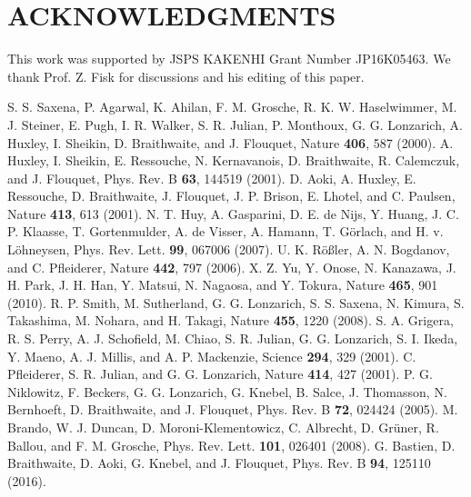 \documentclass[twocolumn,showpacs,preprintnumbers,amsmath,amssymb]{revtex4}
\begin{document}
 \section{ACKNOWLEDGMENTS}
This work was supported by JSPS KAKENHI Grant Number JP16K05463. We thank Prof. Z. Fisk for discussions and his editing of this paper. 




\begin{references}

S. S. Saxena, P. Agarwal, K. Ahilan, F. M. Grosche, R. K. W. Haselwimmer, M. J. Steiner, E. Pugh, I. R. Walker, S. R. Julian, P. Monthoux, G. G. Lonzarich, A. Huxley, I. Sheikin, D. Braithwaite, and J. Flouquet, Nature {\bf 406}, 587 (2000).%
  A. Huxley, I. Sheikin, E. Ressouche, N. Kernavanois, D. Braithwaite, R. Calemczuk, and J. Flouquet, Phys. Rev. B {\bf 63}, 144519 (2001).
D. Aoki, A. Huxley, E. Ressouche, D. Braithwaite, J. Flouquet, J. P. Brison, E. Lhotel, and C. Paulsen, Nature {\bf 413}, 613 (2001).
 N. T. Huy, A. Gasparini, D. E. de Nijs, Y. Huang, J. C. P. Klaasse, T. Gortenmulder, A. de Visser, A. Hamann, T. G{\"{o}}rlach, and H. v. L{\"{o}}hneysen, Phys. Rev. Lett. {\bf 99}, 067006 (2007). 
U. K. R\"o\ss ler, A. N. Bogdanov, and C. Pfleiderer, Nature {\bf 442}, 797 (2006).%
X. Z. Yu, Y. Onose, N. Kanazawa, J. H. Park, J. H. Han, Y. Matsui, N. Nagaosa, and Y. Tokura, Nature {\bf 465}, 901 (2010).%
R. P. Smith, M. Sutherland, G. G. Lonzarich, S. S. Saxena, N. Kimura, S. Takashima, M. Nohara, and H. Takagi, Nature {\bf 455}, 1220 (2008).%
S. A. Grigera, R. S. Perry, A. J. Schofield, M. Chiao, S. R. Julian, G. G. Lonzarich, S. I. Ikeda, Y. Maeno, A. J. Millis, and A. P. Mackenzie, Science {\bf 294}, 329 (2001). %
 C. Pfleiderer, S. R. Julian, and G. G. Lonzarich, Nature {\bf 414}, 427 (2001).%
 P. G. Niklowitz, F. Beckers, G. G. Lonzarich, G. Knebel, B. Salce, J. Thomasson, N. Bernhoeft, D. Braithwaite, and J. Flouquet, Phys. Rev. B {\bf 72}, 024424 (2005).%
 M. Brando, W. J. Duncan, D. Moroni-Klementowicz, C. Albrecht, D. Gr{\"{u}}ner, R. Ballou, and F. M. Grosche, Phys. Rev. Lett. {\bf 101}, 026401 (2008).%
G. Bastien, D. Braithwaite, D. Aoki, G. Knebel, and J. Flouquet, Phys. Rev. B {\bf 94}, 125110 (2016).%

\end{references}
\end{document}
